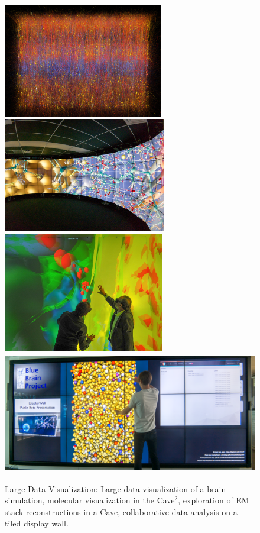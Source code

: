 \begin{figure}[ht]\label{FIG_teaser}
 \includegraphics[height=5cm]{images/slices}\hfil%
 \includegraphics[height=5cm]{images/cave2}\\%
 \includegraphics[height=5.27cm]{images/cave}\hfil%
 \includegraphics[height=5.27cm]{images/tide}%
 \caption{Large Data Visualization: Large data visualization of a
  brain simulation, molecular visualization in the Cave$^2$, exploration of EM
  stack reconstructions in a Cave, collaborative data analysis on a tiled
  display wall.}
\end{figure}

